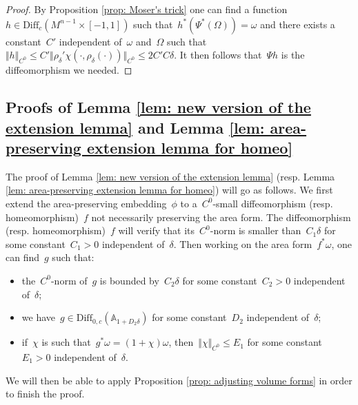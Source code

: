 \documentclass[10pt]{amsart}
\begin{document}
\begin{proof}
By Proposition \ref{prop: Moser's trick} one can find a function~$h\in \text{Diff}_c(M^{n-1}\times[-1,1])$ such that~$h^*(\Psi^*(\Omega))=\omega$ and there exists a constant~$C'$ independent of~$\omega$ and~$\Omega$ such that~$\Vert h \Vert_{C^0}\leq C' \Vert \rho_\delta' \chi(\cdot,\rho_\delta(\cdot))\Vert_{C^0}\leq 2C'C\delta$. It then follows that~$\Psi h$ is the diffeomorphism we needed.

\end{proof}


\subsection{Proofs of Lemma \ref{lem: new version of the extension lemma} and Lemma \ref{lem: area-preserving extension lemma for homeo}}\label{subsec: pf of the area-preserving extension lemma}

The proof of Lemma \ref{lem: new version of the extension lemma} (resp. Lemma \ref{lem: area-preserving extension lemma for homeo}) will go as follows. We first extend the area-preserving embedding~$\phi$ to a~$C^0$-small diffeomorphism (resp. homeomorphism)~$f$ not necessarily preserving the area form. The diffeomorphism (resp. homeomorphism)~$f$ will verify that its~$C^0$-norm is smaller than~$C_1 \delta$ for some constant~$C_1>0$ independent of~$\delta$. Then working on the area form~$f^*\omega$, one can find~$g$ such that:

\begin{itemize}
	\item[$\bullet$] the~$C^0$-norm of~$g$ is bounded by~$C_2 \delta$ for some constant~$C_2>0$ independent of~$\delta$;
    \item[$\bullet$] we have~$g \in \text{Diff}_{0,c}(\mathbb{A}_{1+D_2 \delta})$ for some constant~$D_2$ independent of~$\delta$;
    \item[$\bullet$] if~$\chi$ is such that~$g^*\omega=(1+\chi)\omega$, then~$\Vert \chi \Vert_{C^0} \leq E_1$ for some constant~$E_1>0$ independent of~$\delta$.	
\end{itemize}

We will then be able to apply Proposition \ref{prop: adjusting volume forms} in order to finish the proof.
\end{document}
